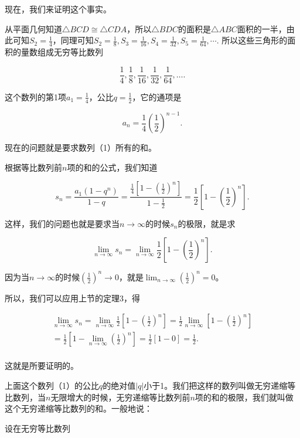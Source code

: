 现在，我们来证明这个事实。

从平面几何知道\(\triangle BCD \cong \triangle CDA\)，所以\(\triangle BDC\)的面积是\(\triangle ABC\)面积的一半，由此可知\(S_{2} = \frac{1}{4}\)，同理可知\(S_{2} = \frac{1}{8}, S_{3} = \frac{1}{16}, S_{4} = \frac{1}{32}, S_{5} = \frac{1}{64}, \cdots.\)
所以这些三角形的面积的量数组成无穷等比数列

\[
\frac{1}{4}, \frac{1}{8}, \frac{1}{16}, \frac{1}{32}, \frac{1}{64}, \dots. \tag {1}
\]

这个数列的第1项\(a_1 = \frac{1}{4}\)，公比\(q = \frac{1}{2}\)，它的通项是

\[
a_{n} = \frac{1}{4} \left(\frac{1}{2}\right)^{n - 1}.
\]

现在的问题就是要求数列（1）所有的和。

根据等比数列前\(n\)项的和的公式，我们知道

\[
s_{n} = \frac{a_{1} (1 - q^{n})}{1 - q} = \frac{\frac{1}{4} \left[ 1 - \left(\frac{1}{2}\right)^{n} \right]}{1 - \frac{1}{2}} = \frac{1}{2} \left[ 1 - \left(\frac{1}{2}\right)^{n} \right].
\]

这样，我们的问题也就是要求当\(n \to \infty\)的时候\(s_n\)的极限，就是求

\[
\lim_{n \rightarrow \infty} s_{n} = \lim_{n \rightarrow \infty} \frac{1}{2} \left[ 1 - \left(\frac{1}{2}\right)^{n} \right].
\]

因为当\(n \to \infty\)的时候\(\left(\frac{1}{2}\right)^n \to 0\)，就是\(\lim_{n \to \infty} \left(\frac{1}{2}\right)^n = 0\)。

所以，我们可以应用上节的定理3，得

\[
\begin{array}{l} \lim_{n \rightarrow \infty} s_{n} = \lim_{n \rightarrow \infty} \frac{1}{2} \left[ 1 - \left(\frac{1}{2}\right)^{n} \right] = \frac{1}{2} \lim_{n \rightarrow \infty} \left[ 1 - \left(\frac{1}{2}\right)^{n} \right] \\ = \frac{1}{2} \left[ 1 - \lim_{n \rightarrow \infty} \left(\frac{1}{2}\right)^{n} \right] = \frac{1}{2} [ 1 - 0 ] = \frac{1}{2}. \\ \end{array}
\]

这就是所要证明的。

上面这个数列（1）的公比\(q\)的绝对值\(|q|\)小于1。我们把这样的数列叫做无穷递缩等比数列，当\(n\)无限增大的时候，无穷递缩等比数列前\(n\)项的和的极限，我们就叫做这个无穷递缩等比数列的和。一般地说：

设在无穷等比数列

